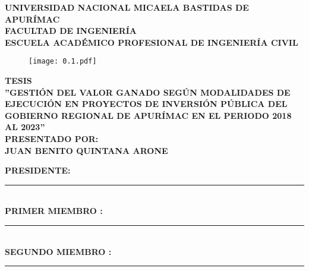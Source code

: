 
\begin{titlepage}
	\begin{center}
		\textbf{\Large{UNIVERSIDAD NACIONAL MICAELA BASTIDAS DE APURÍMAC}}\\
		\vspace{5mm}
		\normalsize{\textbf{FACULTAD DE INGENIERÍA}}\\
		\vspace{5mm}
		\normalsize{\textbf{ESCUELA ACADÉMICO PROFESIONAL DE INGENIERÍA CIVIL}}\\
		\vspace{5mm}
		\begin{figure}[h!]
			\centering
			\texttt{[image: 0.1.pdf]}
		\end{figure}
		
		\vspace{3mm}	
		\textbf{TESIS}\\
		\vspace{7mm} 
		\textbf{''GESTIÓN DEL VALOR GANADO SEGÚN MODALIDADES DE EJECUCIÓN EN PROYECTOS DE INVERSIÓN PÚBLICA DEL GOBIERNO REGIONAL DE APURÍMAC EN EL PERIODO 2018 AL 2023''}\\
		\vspace{10mm}
		\textbf{PRESENTADO POR:}\\
		\textbf{JUAN BENITO QUINTANA ARONE}\\
		\vspace{1.5cm}
		\begin{center}
			\textbf{PRESIDENTE:} \hfill \rule{6cm}{0.4pt}\\
			\vspace{1.5cm}
			\textbf{ PRIMER MIEMBRO	:}\hfill \rule{6cm}{0.4pt}\\
			\vspace{1.5cm}
			\textbf{SEGUNDO MIEMBRO	:}\hfill \rule{6cm}{0.4pt}\\
		\end{center}
		
		\vfill
		
	\end{center}
\end{titlepage}
